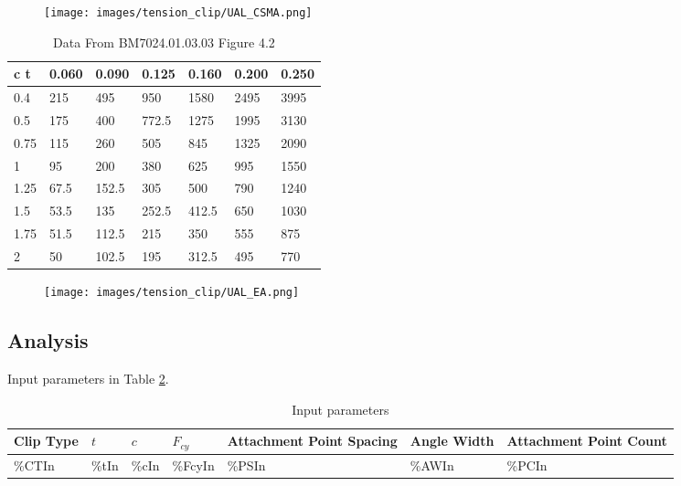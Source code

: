 \documentclass[11pt]{article}
\begin{document}
\begin{figure}[h!]
    \centering
    \texttt{[image: images/tension\_clip/UAL\_CSMA.png]}
    \label{fig:UAL1}
\end{figure}

\begin{table}[!ht]
    \centering
	\label{tab:D4_2}
	\caption{Data From BM7024.01.03.03 Figure 4.2}
    \begin{tabular}{|l|l|l|l|l|l|l|}
    \hline
        c            t & 0.060  & 0.090  & 0.125  & 0.160  & 0.200  & 0.250  \\ \hline
        0.4 & 215 & 495 & 950 & 1580 & 2495 & 3995 \\ \hline
        0.5 & 175 & 400 & 772.5 & 1275 & 1995 & 3130 \\ \hline
        0.75 & 115 & 260 & 505 & 845 & 1325 & 2090 \\ \hline
        1 & 95 & 200 & 380 & 625 & 995 & 1550 \\ \hline
        1.25 & 67.5 & 152.5 & 305 & 500 & 790 & 1240 \\ \hline
        1.5 & 53.5 & 135 & 252.5 & 412.5 & 650 & 1030 \\ \hline
        1.75 & 51.5 & 112.5 & 215 & 350 & 555 & 875 \\ \hline
        2 & 50 & 102.5 & 195 & 312.5 & 495 & 770 \\ \hline
    \end{tabular}
\end{table}

\begin{figure}[h!]
    \centering
    \texttt{[image: images/tension\_clip/UAL\_EA.png]}
    \label{fig:UAL2}
\end{figure}

\clearpage

\subsection{Analysis}

Input parameters in Table \ref{tab:TC1}.

\begin{table}[h]
    \centering
    \begin{tabular}{|l|l|l|l|l|l|l|}
        \hline \textbf{Clip Type} & \textbf{$t$} & \textbf{$c$} & \textbf{$F_{cy}$} & \parbox[c]{3cm}{\textbf{Attachment Point Spacing}} & \textbf{Angle Width} & \parbox[c]{3cm}{\textbf{Attachment Point Count}}\\\hline
        {\%CTIn} & {\%tIn} & {\%cIn} & {\%FcyIn} & {\%PSIn} & {\%AWIn} & {\%PCIn}\\\hline
    \end{tabular}
	\caption{Input parameters}
	\label{tab:TC1}
\end{table}
\end{document}
